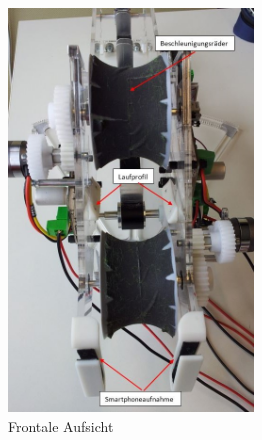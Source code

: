 	\begin{figure}[h!]
	   	\includegraphics[width=0.58\textwidth,clip,trim=0mm 0mm 0mm 0mm]
	   	{Enddokumentation/Bilder/Geraeteuebersicht_3.jpg}
	   	\centering
	   	\caption{Frontale Aufsicht}
	   	\label{abb:Frontale Aufsicht}
	\end{figure}
    
    
    \newpage
